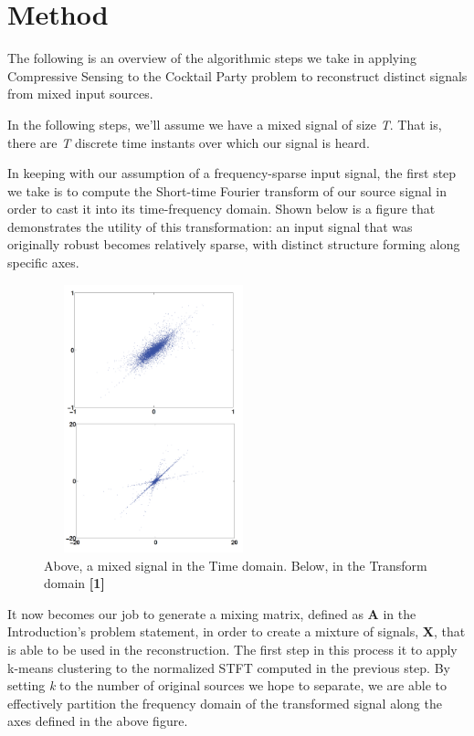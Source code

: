 \documentclass{article}
\begin{document}
\section{Method}
The following is an overview of the algorithmic steps we take in applying Compressive Sensing to the Cocktail Party problem to reconstruct distinct signals from mixed input sources.

In the following steps, we'll assume we have a mixed signal of size \textit{T}. That is, there are \textit{T} discrete time instants over which our signal is heard.

In keeping with our assumption of a frequency-sparse input signal, the first step we take is to compute the Short-time Fourier transform of our source signal in order to cast it into its time-frequency domain. Shown below is a figure that demonstrates the utility of this transformation: an input signal that was originally robust becomes relatively sparse, with distinct structure forming along specific axes.

\begin{figure}[H]
	\centering
	\includegraphics[width=180pt, height=220pt]{figs/transform_domain.png}
	\caption{Above, a mixed signal in the Time domain. Below, in the Transform domain \textbf{[1]}}
	\label{Signal in each Domain}
\end{figure}

It now becomes our job to generate a mixing matrix, defined as \textbf{A} in the Introduction's problem statement, in order to create a mixture of signals, \textbf{X}, that is able to be used in the reconstruction. The first step in this process it to apply k-means clustering to the normalized STFT computed in the previous step. By setting \textit{k} to the number of original sources we hope to separate, we are able to effectively partition the frequency domain of the transformed signal along the axes defined in the above figure.
\end{document}
